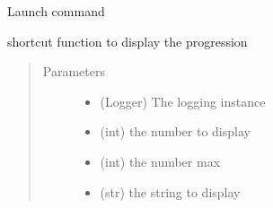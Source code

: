 \documentclass[a4paper,10pt,english]{sphinxmanual}
\begin{document}

\begin{fulllineitems}
\label{\detokenize{apidoc_src/src:src.fork.launch_command}}
Launch command

\end{fulllineitems}


\begin{fulllineitems}
\label{\detokenize{apidoc_src/src:src.fork.show_progress}}
shortcut function to display the progression
\begin{quote}\begin{description}
\item[{Parameters}] \leavevmode\begin{itemize}
\item {} 
 \textendash{} (Logger) The logging instance

\item {} 
 \textendash{} (int) the number to display

\item {} 
 \textendash{} (int) the number max

\item {} 
 \textendash{} (str) the string to display

\end{itemize}

\end{description}\end{quote}

\end{fulllineitems}

\end{document}

